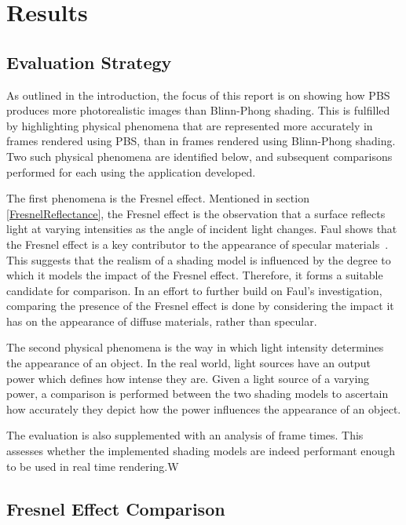 \chapter{Results}
\label{chapter3}

\section{Evaluation Strategy}

As outlined in the introduction, the focus of this report is on showing how PBS produces more photorealistic images than Blinn-Phong shading. This is fulfilled by highlighting physical phenomena that are represented more accurately in frames rendered using PBS, than in frames rendered using Blinn-Phong shading. Two such physical phenomena are identified below, and subsequent comparisons performed for each using the application developed.

The first phenomena is the Fresnel effect. Mentioned in section \ref{FresnelReflectance}, the Fresnel effect is the observation that a surface reflects light at varying intensities as the angle of incident light changes. Faul shows that the Fresnel effect is a key contributor to the appearance of specular materials~\cite{FaulInfluenceOfFresnelEffect}. This suggests that the realism of a shading model is influenced by the degree to which it models the impact of the Fresnel effect. Therefore, it forms a suitable candidate for comparison. In an effort to further build on Faul's investigation, comparing the presence of the Fresnel effect is done by considering the impact it has on the appearance of diffuse materials, rather than specular.

The second physical phenomena is the way in which light intensity determines the appearance of an object. In the real world, light sources have an output power which defines how intense they are. Given a light source of a varying power, a comparison is performed between the two shading models to ascertain how accurately they depict how the power influences the appearance of an object.

The evaluation is also supplemented with an analysis of frame times. This assesses whether the implemented shading models are indeed performant enough to be used in real time rendering.W

\section{Fresnel Effect Comparison}


